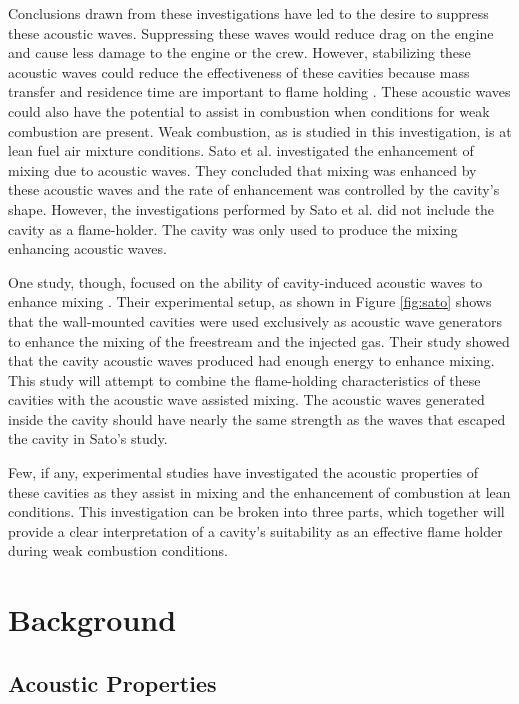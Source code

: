 Conclusions drawn from these investigations have led to the desire to suppress these acoustic waves. Suppressing these waves would reduce drag on the engine and cause less damage to the engine or the crew. However, stabilizing these acoustic waves could reduce the effectiveness of these cavities because mass transfer and residence time are important to flame holding \cite{ben2001cavity}. These acoustic waves could also have the potential to assist in combustion when conditions for weak combustion are present. Weak combustion, as is studied in this investigation, is at lean fuel air mixture conditions. Sato et al.\cite{sato1999advanced} investigated the enhancement of mixing due to acoustic waves. They concluded that mixing was enhanced by these acoustic waves and the rate of enhancement was controlled by the cavity's shape. However, the investigations performed by Sato et al. did not include the cavity as a flame-holder. The cavity was only used to produce the mixing enhancing acoustic waves. 

One study, though, focused on the ability of cavity-induced acoustic waves to enhance mixing \cite{sato1999advanced}. Their experimental setup, as shown in Figure \ref{fig:sato} shows that the wall-mounted cavities were used exclusively as acoustic wave generators to enhance the mixing of the freestream and the injected gas. Their study showed that the cavity acoustic waves produced had enough energy to enhance mixing. This study will attempt to combine the flame-holding characteristics of these cavities with the acoustic wave assisted mixing. The acoustic waves generated inside the cavity should have nearly the same strength as the waves that escaped the cavity in Sato's study. 

Few, if any, experimental studies have investigated the acoustic properties of these cavities as they assist in mixing and the enhancement of combustion at lean conditions. This investigation can be broken into three parts, which together will provide a clear interpretation of a cavity's suitability as an effective flame holder during weak combustion conditions. 


\section{Background}

\subsection{Acoustic Properties}

